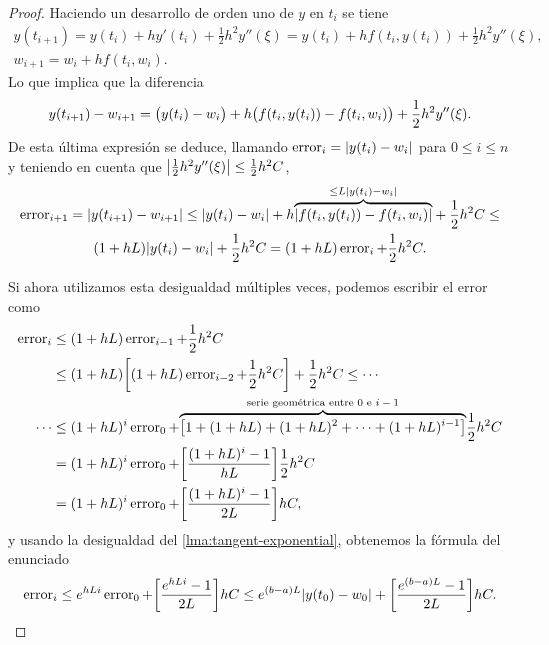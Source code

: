 \begin{proof}
    \newcommand{\err}{\operatorname{error}}

    Haciendo un desarrollo de orden uno de $y$ en $t_i$ se tiene
    \begin{gather*}
        y(t_{i+1}) = y(t_i) + hy'(t_i) + \frac{1}{2}h^2y''(\xi) =
            y(t_i) + hf(t_i, y(t_i)) + \frac{1}{2}h^2y''(\xi), \\
        w_{i+1} = w_i + hf(t_i, w_i).
    \end{gather*}
    Lo que implica que la diferencia
    \begin{equation*}
        y(t_{i+1}) - w_{i+1} =
        \qty\big(y(t_i) - w_i) + h\qty\big(f(t_i, y(t_i)) - f(t_i, w_i))
            + \frac{1}{2}h^2y''(\xi).
    \end{equation*}
    De esta última expresión se deduce,
    llamando $\err_i = \abs{y(t_i) - w_i}$ para $0 \le i \le n$
    y teniendo en cuenta que $\abs{\frac{1}{2}h^2y''(\xi)} \le \frac{1}{2}h^2C$,
    \begin{multline*}
        \err_{i+1} = \abs{y(t_{i+1}) - w_{i+1}} \le
        \abs{y(t_i) - w_i} + h\overset{\le L\abs{y(t_i) - w_i}}{
            \overbrace{\abs{f(t_i, y(t_i)) - f(t_i, w_i)}}
        }  + \frac{1}{2}h^2C \le \\
        (1 + hL)\abs{y(t_i) - w_i} + \frac{1}{2}h^2C =
        (1 + hL)\err_i + \frac{1}{2}h^2C.
    \end{multline*}

    Si ahora utilizamos esta desigualdad múltiples veces,
    podemos escribir el error como
    \begin{align*}
        \err_i \le {} & (1 + hL)\err_{i-1} + \frac{1}{2}h^2C \\
        \le {} & (1 + hL)\qty[(1 + hL)\err_{i-2} + \frac{1}{2}h^2C]
            + \frac{1}{2}h^2C \le \cdots \\
        \cdots \le {} & (1 + hL)^i\err_0
            + \overset{\textnormal{serie geométrica entre $0$ e $i-1$}}{
                \overbrace{\qty[
                    1 + (1 + hL) + (1 + hL)^2 + \cdots + (1 + hL)^{i-1}
                ]}
            } \frac{1}{2}h^2C \\
        = {} & (1 + hL)^i \err_0
            + \qty[\frac{(1 + hL)^i - 1}{hL}] \frac{1}{2}h^2C \\
        = {} & (1 + hL)^i \err_0
            + \qty[\frac{(1 + hL)^i - 1}{2L}] hC,
    \end{align*}
    y usando la desigualdad del \cref{lma:tangent-exponential},
    obtenemos la fórmula del enunciado
    \begin{equation*}
        \err_i \le
        \nume^{hLi}\err_0 + \qty[\frac{\nume^{hLi} - 1}{2L}] hC \le
        \nume^{(b-a)L}\abs{y(t_0) - w_0} + \qty[\frac{\nume^{(b-a)L}-1}{2L}]hC.
        \qedhere
    \end{equation*}
\end{proof}

